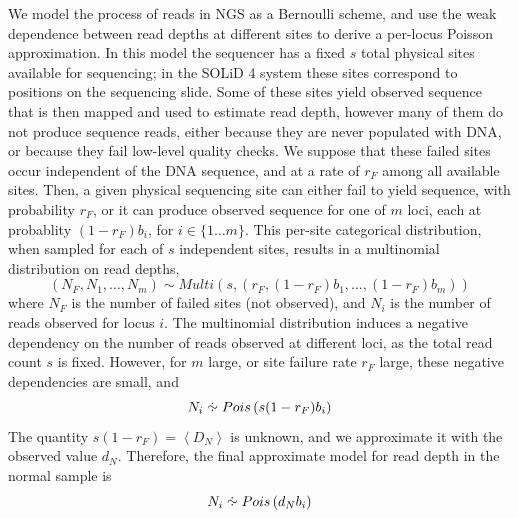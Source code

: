 \documentclass[thesis.tex]{subfiles}
\begin{document}
We model the process of reads in \gls{NGS} as a Bernoulli scheme, and use the weak dependence between read depths at different sites to derive a per-locus Poisson approximation.  In this model the sequencer has a fixed $s$ total physical sites available for sequencing; in the SOLiD 4 system these sites correspond to positions on the sequencing slide.  Some of these sites yield observed sequence that is then mapped and used to estimate read depth, however many of them do not produce sequence reads, either because they are never populated with DNA, or because they fail low-level quality checks.  We suppose that these failed sites occur independent of the DNA sequence, and at a rate of $r_F$ among all available sites.  Then, a given physical sequencing site can either fail to yield sequence, with probability $r_F$, or it can produce observed sequence for one of $m$ loci, each at probablity $(1-r_F)b_i$, for $i \in \{1 \dots m\}$.  This per-site categorical distribution, when sampled for each of $s$ independent sites, results in a multinomial distribution on read depths,
\begin{equation}
\left(N_F, N_1, \dots, N_m\right) \sim Multi\left(s, \left(r_F, (1-r_F)b_1, \dots, (1-r_F)b_m\right)\right)
\end{equation}
where $N_F$ is the number of failed sites (not observed), and $N_i$ is the number of reads observed for locus $i$.  The multinomial distribution induces a negative dependency on the number of reads observed at different loci, as the total read count $s$ is fixed.  However, for $m$ large, or site failure rate $r_F$ large\cite{McDonald1980}, these negative dependencies are small, and 
\begin{equation}
  N_i \approxdist Pois\left(s (1-r_F) b_i\right)
\end{equation}
The quantity $s(1-r_F) = \left<D_N\right>$ is unknown, and we approximate it with the observed value $d_N$.  Therefore, the final approximate model for read depth in the normal sample is
\begin{equation}
  N_i \approxdist Pois\left(d_N b_i\right) \label{eq:comp_cnv_Npois}
\end{equation}
\end{document}
